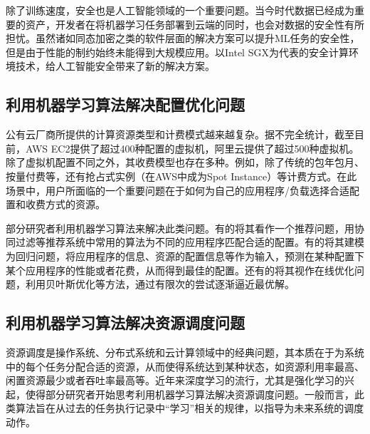 除了训练速度，安全也是人工智能领域的一个重要问题。当今时代数据已经成为重要的资产，开发者在将机器学习任务部署到云端的同时，也会对数据的安全性有所担忧。虽然诸如同态加密之类的软件层面的解决方案可以提升ML任务的安全性，但是由于性能的制约始终未能得到大规模应用。以Intel SGX为代表的安全计算环境技术，给人工智能安全带来了新的解决方案。

\subsection{利用机器学习算法解决配置优化问题}
公有云厂商所提供的计算资源类型和计费模式越来越复杂。据不完全统计，截至目前，AWS EC2提供了超过400种配置的虚拟机，阿里云提供了超过500种虚拟机。除了虚拟机配置不同之外，其收费模型也存在多种。例如，除了传统的包年包月、按量付费等，还有抢占式实例（在AWS中成为Spot Instance）等计费方式。在此场景中，用户所面临的一个重要问题在于如何为自己的应用程序/负载选择合适配置和收费方式的资源。

部分研究者利用机器学习算法来解决此类问题。有的将其看作一个推荐问题\parencite{klimovic2018selecta}，用协同过滤等推荐系统中常用的算法为不同的应用程序匹配合适的配置。有的将其建模为回归问题\parencite{yadwadkar2017selecting,venkataraman2016ernest,moradi2019performance,zheng2019online}，将应用程序的信息、资源的配置信息等作为输入，预测在某种配置下某个应用程序的性能或者花费，从而得到最佳的配置。还有的将其视作在线优化问题\parencite{alipourfard2017cherrypick,casimiro2019lynceus}，利用贝叶斯优化等方法，通过有限次的尝试逐渐逼近最优解。

\subsection{利用机器学习算法解决资源调度问题}
资源调度是操作系统、分布式系统和云计算领域中的经典问题，其本质在于为系统中的每个任务分配合适的资源，从而使得系统达到某种状态，如资源利用率最高、闲置资源最少或者吞吐率最高等。近年来深度学习的流行，尤其是强化学习的兴起，使得部分研究者开始思考利用机器学习算法解决资源调度问题\parencite{delimitrou2014quasar,mao2019learning,chung2018stratus}。一般而言，此类算法旨在从过去的任务执行记录中“学习”相关的规律，以指导为未来系统的调度动作。
